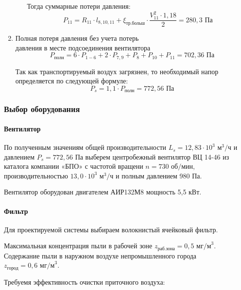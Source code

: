 \begin{enumerate}
\begin{itemize}
                    Тогда суммарные потери давления:
                    $$
                        P_{11} = R_{11} \cdot l_{8,10,11}
                                    + \xi_\text{тр.больш} \cdot \frac{V_{11}^2 \cdot 1,18}{2}
                                = 280,3 \text{ Па}
                    $$
        \end{itemize}

        \item   Полная потеря давления без учета потерь \\ давления в месте подсоединения вентилятора
                $$
                    P_\text{полн} = 6 \cdot P_{1-6} + 2 \cdot P_{7,9} + P_{8} + P_{10} + P_{11}
                                = 702,36 \text{ Па}
                $$

                Так как транспортируемый воздух загрязнен, то необходимый напор
                определяется по следующей формуле:
                $$
                    P_s = 1,1 \cdot P_\text{полн} = 772,56 \text{ Па}
                $$
\end{enumerate}

\subsubsection{Выбор оборудования}

\paragraph{Вентилятор}
По полученным значениям общей производительности $L_s = 12,83 \cdot 10^3 \text{ м}^3 / \text{ч}$
и давлением $P_s = 772,56 \text{ Па}$ выберем центробежный
вентилятор ВЦ 14-46 из каталога компании «БПО» с частотой вращени
$n = 730 \text{ об/мин}$, производительностью $13,0 \cdot 10^3 \text{ м}^3 / \text{ч}$
и полным давлением 980 Па.

Вентилятор оборудован двигателем АИР132М8 мощность 5,5 кВт.

\paragraph{Фильтр}
Для проектируемой системы выбираем волокнистый ячейковый фильтр.

Максимальная концентрация пыли в рабочей зоне $z_\text{раб.зона} = 0,5 \text{ мг/м}^3$.
Содержание пыли в наружном воздухе непромышленного города $z_\text{город} = 0,6 \text{ мг/м}^3$.

Требуемя эффективность очистки приточного воздуха:


